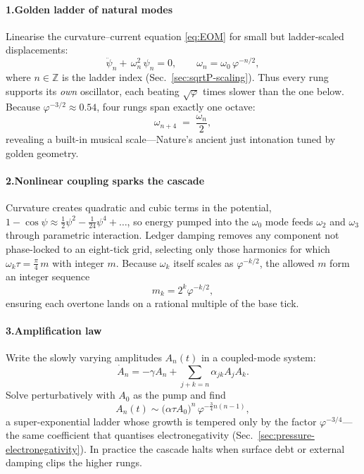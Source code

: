 \documentclass[11pt,oneside]{book}
\begin{document}
\paragraph*{1.\;Golden ladder of natural modes}

Linearise the curvature–current equation \eqref{eq:EOM} for small but ladder‐scaled displacements:
\[
\ddot{\psi}_{n}+\,\omega_{n}^{2}\,\psi_{n}=0,
\qquad
\omega_{n}=\omega_{0}\,\varphi^{-n/2},
\]
where $n\in\mathbb Z$ is the ladder index (Sec.~\ref{sec:sqrtP-scaling}).  
Thus every rung supports its \emph{own} oscillator, each beating $\sqrt{\varphi}$ times slower than the one below.  
Because $\varphi^{-3/2}\approx 0.54$, four rungs span exactly one octave:
\[
\omega_{n+4} \;=\; \frac{\omega_{n}}{2},
\]
revealing a built-in musical scale—Nature’s ancient just intonation tuned by golden geometry.

\paragraph*{2.\;Nonlinear coupling sparks the cascade}

Curvature creates quadratic and cubic terms in the potential,
\(
1-\cos\psi \approx \tfrac12\psi^{2}-\tfrac1{24}\psi^{4}+\dots
\),
so energy pumped into the $\omega_{0}$ mode feeds $\omega_{2}$ and
$\omega_{3}$ through parametric interaction.  
Ledger damping removes any component not phase-locked to an eight-tick
grid, selecting only those harmonics for which
\(
\omega_{k}\tau = \frac{\pi}{4}\,m
\)
with integer $m$.  
Because $\omega_{k}$ itself scales as $\varphi^{-k/2}$, the allowed
$m$ form an integer sequence
\[
m_{k} = 2^{k}\varphi^{-k/2},
\]
ensuring each overtone lands on a rational multiple of the base tick.

\paragraph*{3.\;Amplification law}

Write the slowly varying amplitudes $A_{n}(t)$ in a coupled-mode system:
\[
\dot A_{n} = -\gamma A_{n} 
             + \sum_{j+k=n} \alpha_{jk} A_{j}A_{k}.
\]
Solve perturbatively with $A_{0}$ as the pump and find
\[
A_{n}(t) \sim
\bigl(\alpha\tau A_{0}\bigr)^{n}\,\varphi^{-\frac34 n(n-1)},
\]
a super-exponential ladder whose growth is tempered only by the factor
$\varphi^{-3/4}$—the same coefficient that quantises electronegativity
(Sec.~\ref{sec:pressure-electronegativity}).  
In practice the cascade halts when surface debt or external damping
clips the higher rungs.
\end{document}
